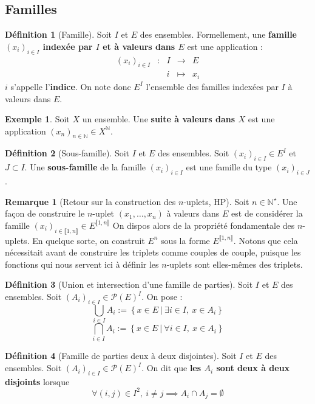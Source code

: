 \documentclass[french]{book}
\newcommand{\N}{\mathbb{N}}
\newcommand{\st}{^\star}
\theoremstyle{plain}
\theoremstyle{definition}
\newtheorem{dfn}{Définition}[chapter]
\newtheorem{exa}{Exemple}[chapter]
\newtheorem{rmq}{Remarque}[chapter]
\theoremstyle{remark}
\begin{document}
\subsection{Familles}
\begin{dfn}[Famille]
	Soit $I$ et $E$ des ensembles. Formellement, une \textbf{famille $(x_i)_{i\in I}$ indexée par $I$ et à valeurs dans $E$} est une application : $$\begin{array}{ccccc}(x_i)_{i\in I}&:&I&\rightarrow&E\\&&i&\mapsto&x_i\end{array}$$ $i$ s'appelle l'\textbf{indice}. On note donc $E^I$ l'ensemble des familles indexées par $I$ à valeurs dans $E$.
\end{dfn}
\begin{exa}
	Soit $X$ un ensemble. Une \textbf{suite à valeurs dans $X$} est une application $(x_n)_{n\in\N}\in X^\N$.
\end{exa}
\begin{dfn}[Sous-famille]
	Soit $I$ et $E$ des ensembles. Soit $(x_i)_{i\in I}\in E^I$ et $J\subset I$. Une \textbf{sous-famille} de la famille $(x_i)_{i\in I}$ est une famille du type $(x_i)_{i\in J}$.
\end{dfn}
\begin{rmq}[Retour sur la construction des $n$-uplets, HP]
	Soit $n\in\N\st$. Une façon de construire le $n$-uplet $(x_1,\ldots,x_n)$ à valeurs dans $E$ est de considérer la famille $(x_i)_{i\in\llbracket1,n\rrbracket}\in E^{\llbracket1,n\rrbracket}$ On dispos alors de la propriété fondamentale des $n$-uplets. En quelque sorte, on construit $E^n$ sous la forme $E^{\llbracket1,n\rrbracket}$. Notons que cela nécessitait avant de construire les triplets comme couples de couple, puisque les fonctions qui nous servent ici à définir les $n$-uplets sont elles-mêmes des triplets.
\end{rmq}
\begin{dfn}[Union et intersection d'une famille de parties]
	Soit $I$ et $E$ des ensembles. Soit $(A_i)_{i\in I}\in\mathcal{P}(E)^I$. On pose : $$\bigcup_{i\in I}A_i:=\left\{x\in E \ | \ \exists i\in I,\ x\in A_i\right\}$$ $$\bigcap_{i\in I}A_i:=\left\{x\in E \ | \ \forall i\in I,\ x\in A_i\right\}$$  
\end{dfn}
\begin{dfn}[Famille de parties deux à deux disjointes]
	Soit $I$ et $E$ des ensembles. Soit $(A_i)_{i\in I}\in\mathcal{P}(E)^I$. On dit que \textbf{les $A_i$ sont deux à deux disjoints} lorsque $$\forall(i,j)\in I^2,\ i\ne j\implies A_i\cap A_j=\emptyset$$
\end{dfn}
\end{document}
